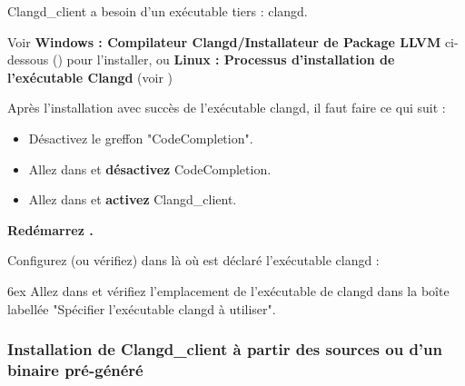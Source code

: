 Clangd\_client a besoin d'un exécutable tiers : clangd.

Voir \textbf{Windows : Compilateur Clangd/Installateur de Package LLVM} ci-dessous () pour l'installer, ou \textbf{Linux : Processus d'installation de l'exécutable Clangd} (voir )

Après l'installation avec succès de l'exécutable clangd, il faut faire ce qui suit :

\begin{itemize}[noitemsep]
\item Désactivez le greffon "CodeCompletion".
\item Allez dans  et \textbf{désactivez} CodeCompletion.
\item Allez dans  et \textbf{activez} Clangd\_client.
\end{itemize}
\textbf{Redémarrez \codeblocks.}

Configurez (ou vérifiez) dans \codeblocks là où est déclaré l'exécutable clangd :\par
\begingroup
\leftskip 6ex
Allez dans  et vérifiez l'emplacement de l'exécutable de clangd dans la boîte labellée "Spécifier l'exécutable clangd à utiliser".
\par
\endgroup

\subsubsection{Installation de Clangd\_client à partir des sources ou d'un binaire pré-généré}

